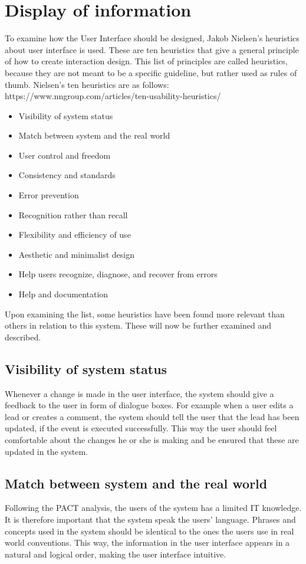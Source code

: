 \section{Display of information}

To examine how the User Interface should be designed, Jakob Nielsen's heuristics about user interface is used. These are ten heuristics that give a general principle of how to create interaction design. This list of principles are called heuristics, because they are not meant to be a specific guideline, but rather used as rules of thumb. Nielsen's ten heuristics are as follows: https://www.nngroup.com/articles/ten-usability-heuristics/
\begin{itemize}
    \item Visibility of system status
    \item Match between system and the real world
    \item User control and freedom
    \item Consistency and standards
    \item Error prevention
    \item Recognition rather than recall
    \item Flexibility and efficiency of use
    \item Aesthetic and minimalist design
    \item Help users recognize, diagnose, and recover from errors
    \item Help and documentation
\end{itemize}
Upon examining the list, some heuristics have been found more relevant than others in relation to this system. These will now be further examined and described.

\subsection{Visibility of system status}
Whenever a change is made in the user interface, the system should give a feedback to the user in form of dialogue boxes. For example when a user edits a lead or creates a comment, the system should tell the user that the lead has been updated, if the event is executed successfully. This way the user should feel comfortable about the changes he or she is making and be ensured that these are updated in the system.

\subsection{Match between system and the real world}
Following the PACT analysis, the users of the system has a limited IT knowledge. It is therefore important that the system speak the users' language. Phrases and concepts used in the system should be identical to the ones the users use in real world conventions. This way, the information in the user interface appears in a natural and logical order, making the user interface intuitive. 

